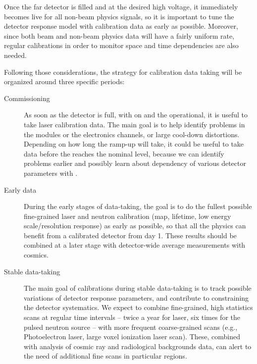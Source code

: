 Once the far detector is filled and at the desired high voltage, it immediately becomes live for all non-beam physics signals, so it is important to tune the detector response model with calibration data as early as possible. Moreover, since both beam and non-beam physics data will have a fairly uniform rate, regular calibrations in order to monitor space and time dependencies are also needed.

Following those considerations, the strategy for calibration data taking will be organized around three specific periods:
\begin{description}
\item[Commissioning] As soon as the detector is full, with  on and the  operational, it is useful to take laser calibration data. The main goal is to help identify problems in the  modules or the electronics channels, or large cool-down distortions. Depending on how long the ramp-up will take, it could be useful to take data before the  reaches the nominal level, because we can identify problems earlier and possibly learn about dependency of various detector parameters with \efield.
\item[Early data] During the early stages of data-taking, the goal is to do the fullest possible fine-grained laser and neutron calibration (\efield map, lifetime, low energy scale/resolution response) as early as possible, so that all the physics can benefit from a calibrated detector from day 1. 
These results should be combined at a later stage with detector-wide average measurements with cosmics. 
\item[Stable data-taking] The main goal of %
calibrations during stable data-taking is to track possible variations of detector response parameters, and contribute to constraining the %
detector systematics. We expect to combine fine-grained, high statistics scans at regular time intervals -- twice a year for laser, six times for the pulsed neutron source -- with more frequent coarse-grained scans (e.g., Photoelectron laser, large voxel ionization laser scan). These, combined with analysis of cosmic ray and radiological backgrounds data, can alert to the need of additional fine scans in particular regions.
\end{description}